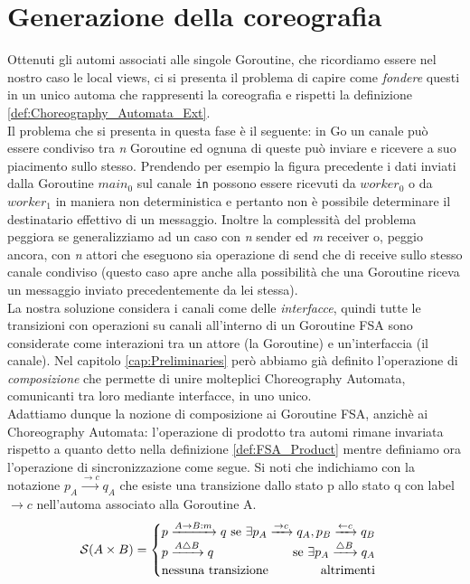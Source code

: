 \section{Generazione della coreografia} \label{sec:Go_Composition}
Ottenuti gli automi associati alle singole Goroutine, che ricordiamo essere nel nostro caso le local views, ci si presenta il problema di capire come \emph{fondere} questi in un unico automa che rappresenti la coreografia e rispetti la definizione \ref{def:Choreography_Automata_Ext}.\bigskip \\
Il problema che si presenta in questa fase è il seguente: in Go un canale può essere condiviso tra \emph{n} Goroutine ed ognuna di queste può inviare e ricevere a suo piacimento sullo stesso. Prendendo per esempio la figura precedente i dati inviati dalla Goroutine $main_0$ sul canale \texttt{in} possono essere ricevuti da $worker_0$ o da $worker_1$ in maniera non deterministica e pertanto non è possibile determinare il destinatario effettivo di un messaggio. Inoltre la complessità del problema peggiora se generalizziamo ad un caso con \emph{n} sender ed \emph{m} receiver o, peggio ancora, con \emph{n} attori che eseguono sia operazione di send che di receive sullo stesso canale condiviso (questo caso apre anche alla possibilità che una Goroutine riceva un messaggio inviato precedentemente da lei stessa). \bigskip \\
La nostra soluzione considera i canali come delle \emph{interfacce}, quindi tutte le transizioni con operazioni su canali all'interno di un Goroutine FSA sono considerate come interazioni tra un attore (la Goroutine) e un'interfaccia (il canale). Nel capitolo \ref{cap:Preliminaries} però abbiamo già definito l'operazione di \emph{composizione} che permette di unire molteplici Choreography Automata, comunicanti tra loro mediante interfacce, in uno unico.\\
Adattiamo dunque la nozione di composizione ai Goroutine FSA, anzichè ai Choreography Automata: l'operazione di prodotto tra automi rimane invariata rispetto a quanto detto nella definizione \ref{def:FSA_Product} mentre definiamo ora l'operazione di sincronizzazione come segue. Si noti che indichiamo con la notazione $p_A \xrightarrow{\rightarrow c} q_A$ che esiste una transizione dallo stato p allo stato q con label $\rightarrow c$ nell'automa associato alla Goroutine A.
\begin{equation*}
    \mathcal{S}(A \times B) =
    \begin{cases}
        p \xrightarrow{A \rightarrow B: m} q \hfill \text{ se } \exists p_A \xrightarrow{\rightarrow c} q_A,  p_B \xrightarrow{\leftarrow c} q_B \\
        p \xrightarrow{A \bigtriangleup B} q \hfill \text{ se } \exists p_A \xrightarrow{\bigtriangleup B}q_A                                    \\
        \text{nessuna transizione} \hfill \text{altrimenti}
    \end{cases}
\end{equation*}
